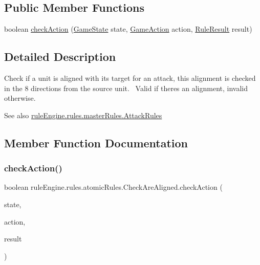 \subsection*{Public Member Functions}
\begin{DoxyCompactItemize}
\item 
boolean \mbox{\hyperlink{classrule_engine_1_1rules_1_1atomic_rules_1_1_check_are_aligned_a04fe3215ef18fd621e84918682342354}{check\+Action}} (\mbox{\hyperlink{classgame_1_1game_state_1_1_game_state}{Game\+State}} state, \mbox{\hyperlink{classrule_engine_1_1_game_action}{Game\+Action}} action, \mbox{\hyperlink{classrule_engine_1_1_rule_result}{Rule\+Result}} result)
\end{DoxyCompactItemize}


\subsection{Detailed Description}
Check if a unit is aligned with its target for an attack, this alignment is checked in the 8 directions from the source unit.~\newline
 Valid if there\textquotesingle{}s an alignment, invalid otherwise.

\begin{DoxySeeAlso}{See also}
\mbox{\hyperlink{classrule_engine_1_1rules_1_1master_rules_1_1_attack_rules}{rule\+Engine.\+rules.\+master\+Rules.\+Attack\+Rules}} 
\end{DoxySeeAlso}


\subsection{Member Function Documentation}
\mbox{\label{classrule_engine_1_1rules_1_1atomic_rules_1_1_check_are_aligned_a04fe3215ef18fd621e84918682342354}} 
\subsubsection{\texorpdfstring{check\+Action()}{checkAction()}}
{\footnotesize\ttfamily boolean rule\+Engine.\+rules.\+atomic\+Rules.\+Check\+Are\+Aligned.\+check\+Action (\begin{DoxyParamCaption}\item[{\mbox{\hyperlink{classgame_1_1game_state_1_1_game_state}{Game\+State}}}]{state,  }\item[{\mbox{\hyperlink{classrule_engine_1_1_game_action}{Game\+Action}}}]{action,  }\item[{\mbox{\hyperlink{classrule_engine_1_1_rule_result}{Rule\+Result}}}]{result }\end{DoxyParamCaption})\hspace{0.3cm}{\ttfamily [inline]}}



